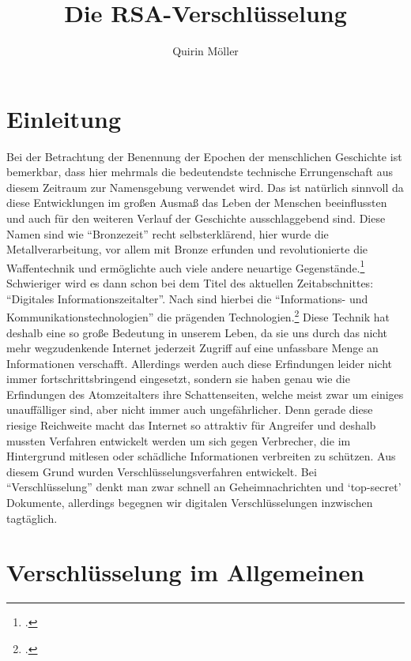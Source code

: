 \documentclass{scrarticle}
\title{Die RSA-Verschlüsselung}
\author{Quirin Möller}
\begin{document}
    
    \tableofcontents
    \newpage
    \setcounter{page}{3}

    \section{Einleitung}
    Bei der Betrachtung der Benennung der Epochen der menschlichen Geschichte ist bemerkbar, dass hier mehrmals die bedeutendste technische Errungenschaft aus diesem Zeitraum zur Namensgebung verwendet wird. Das ist natürlich sinnvoll da diese Entwicklungen im großen Ausmaß das Leben der Menschen beeinflussten und auch für den weiteren Verlauf der Geschichte ausschlaggebend sind. Diese Namen sind  wie \enquote{Bronzezeit} recht selbsterklärend, hier wurde die Metallverarbeitung, vor allem mit Bronze erfunden und revolutionierte die Waffentechnik und ermöglichte auch viele andere neuartige Gegenstände.\footcite[vgl.][]{BronzezeitEuropaDeutschland} 
    Schwieriger wird es dann schon bei dem Titel des aktuellen Zeitabschnittes: \enquote{Digitales Informationszeitalter}. Nach  sind hierbei die \enquote{Informations- und Kommunikationstechnologien} die prägenden Technologien.\footcite{jornlengsfeld}
    Diese Technik hat deshalb eine so große Bedeutung in unserem Leben, da sie uns durch das nicht mehr wegzudenkende Internet jederzeit Zugriff auf eine unfassbare Menge an Informationen verschafft. Allerdings werden auch diese Erfindungen leider nicht immer fortschrittsbringend eingesetzt, sondern sie haben genau wie die Erfindungen des Atomzeitalters ihre Schattenseiten, welche meist zwar um einiges unauffälliger sind, aber nicht immer auch ungefährlicher. Denn gerade diese riesige Reichweite macht das Internet so attraktiv für Angreifer und deshalb mussten Verfahren entwickelt werden um sich gegen Verbrecher, die im Hintergrund mitlesen oder schädliche Informationen verbreiten zu schützen. Aus diesem Grund wurden Verschlüsselungsverfahren entwickelt. Bei \enquote{Verschlüsselung} denkt man zwar schnell an Geheimnachrichten und \enquote*{top-secret} Dokumente, allerdings begegnen wir digitalen Verschlüsselungen inzwischen tagtäglich.

    \section[Verschlüsselung allgemein]{Verschlüsselung im Allgemeinen}
\end{document}
